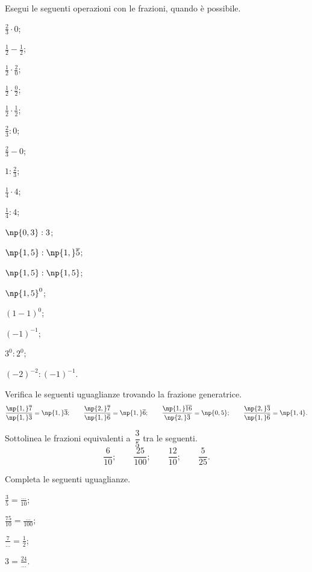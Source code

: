 \begin{esercizio}
Esegui le seguenti operazioni con le frazioni, quando è possibile.
\begin{multicols}{3}
\begin{enumeratea}
\spazielenx
\item $\displaystyle{\frac{2}{3}\cdot0}$;
\item $\displaystyle{\frac{1}{2}-\frac{1}{2}}$;
\item $\displaystyle{\frac{1}{2}\cdot\frac{2}{0}}$;
\item $\displaystyle{\frac{1}{2}}\cdot\frac{0}{2}$;
\item $\displaystyle{\frac{1}{2}\cdot\frac{1}{2}}$;
\item $\displaystyle{\frac{2}{3}:0}$;
\item $\displaystyle{\frac{2}{3}-0}$;
\item $\displaystyle{1:\frac{2}{3}}$;
\item $\displaystyle{\frac{1}{4}\cdot4}$;
\item $\displaystyle{\frac{1}{4}:4}$;
\item $\np{0,3}:3$;
\item $\displaystyle{\np{1,5}:\np{1,}\overline{5}}$;
\item $\np{1,5}:\np{1,5}$;
\item $\np{1,5}^0$;
\item $(1-1)^0$;
\item $(-1)^{-1}$;
\item $3^0:2^0$;
\item $(-2)^{-2}:(-1)^{-1}$.
\end{enumeratea}
\end{multicols}
\end{esercizio}

\begin{esercizio}
Verifica le seguenti uguaglianze trovando la frazione generatrice.
\[\frac{\np{1,}\overline{7}}{\np{1,}\overline{3}}=\np{1,}\overline{3};\qquad%
\frac{\np{2,}\overline{7}}{\np{1,}\overline{6}}=\np{1,}\overline{6};\qquad%
\frac{\np{1,}\overline{16}}{\np{2,}\overline{3}}=\np{0,5};\qquad%
\frac{\np{2,}\overline{3}}{\np{1,}\overline{6}}=\np{1,4}.\]
\end{esercizio}


\begin{esercizio}
Sottolinea le frazioni equivalenti a~$\dfrac{3}{5}$ tra le seguenti.
\[\frac{6}{10};\qquad\frac{25}{100};\qquad\frac{12}{10};\qquad\frac{5}{25}.\]
\end{esercizio}
\begin{esercizio}
Completa le seguenti uguaglianze.
\begin{multicols}{4}
\begin{enumeratea}
\item $\displaystyle{\frac{3}{5}=\frac{\ldots}{10}}$;
\item $\displaystyle{\frac{75}{10}=\frac{\ldots}{100}}$;
\item $\displaystyle{\frac{7}{\ldots}=\frac{1}{2}}$;
\item $\displaystyle{3=\frac{24}{\ldots}}$.
\end{enumeratea}
\end{multicols}
\end{esercizio}

